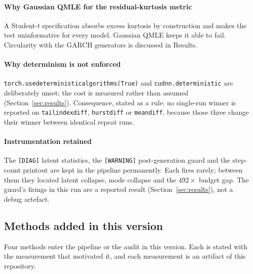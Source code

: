 \documentclass[11pt,a4paper]{article}
\makeatletter
\DeclareRobustCommand{\_}{\ifmmode\nfss@text{\textunderscore}\else\textunderscore\allowbreak\fi}
\makeatother
\begin{document}
\paragraph{Why Gaussian QMLE for the residual-kurtosis metric} A Student-$t$ specification absorbs excess kurtosis by construction and makes the test uninformative for every model. Gaussian QMLE keeps it able to fail. Circularity with the GARCH generators is discussed in Results.

\paragraph{Why determinism is not enforced} \texttt{torch.use\_deterministic\_algorithms(True)} and \texttt{cudnn.deterministic} are deliberately unset; the cost is measured rather than assumed (Section~\ref{sec:results}). Consequence, stated as a rule: no single-run winner is reported on \texttt{tail\_index\_diff}, \texttt{hurst\_diff} or \texttt{mean\_diff}, because those three change their winner between identical repeat runs.

\paragraph{Instrumentation retained} The \texttt{[DIAG]} latent statistics, the \texttt{[WARNING]} post-generation guard and the step-count printout are kept in the pipeline permanently. Each fires rarely; between them they located latent collapse, mode collapse and the $492\times$ budget gap. The guard's firings in this run are a reported result (Section~\ref{sec:results}), not a debug artefact.
\subsection{Methods added in this version}
\label{sec:newmethods}
Four methods enter the pipeline or the audit in this version. Each is stated with the measurement that motivated it, and each measurement is an artifact of this repository.
\end{document}
